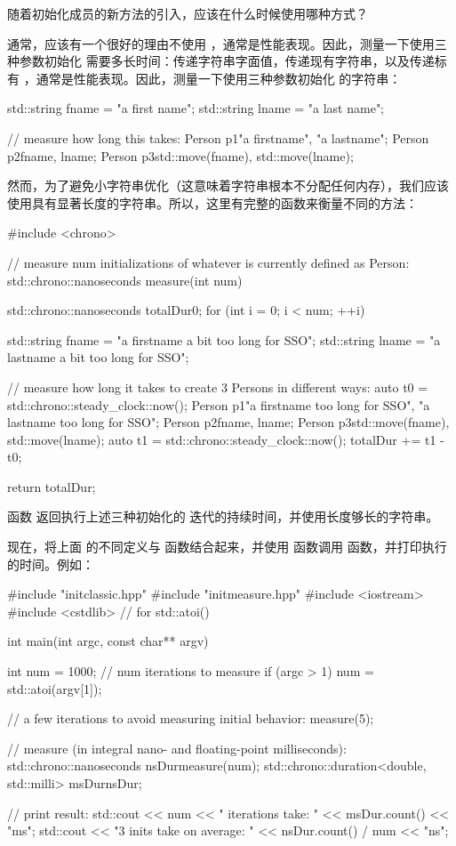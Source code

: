 随着初始化成员的新方法的引入，应该在什么时候使用哪种方式？

通常，应该有一个很好的理由不使用 ，通常是性能表现。因此，测量一下使用三种参数初始化  需要多长时间：传递字符串字面值，传递现有字符串，以及传递标有 ，通常是性能表现。因此，测量一下使用三种参数初始化  的字符串：

\begin{cppcode}
std::string fname = "a first name";
std::string lname = "a last name";

// measure how long this takes:
Person p1{"a firstname", "a lastname"};
Person p2{fname, lname};
Person p3{std::move(fname), std::move(lname)};
\end{cppcode}

然而，为了避免小字符串优化（这意味着字符串根本不分配任何内存），我们应该使用具有显著长度的字符串。所以，这里有完整的函数来衡量不同的方法：

\begin{cppcode}
#include <chrono>

// measure num initializations of whatever is currently defined as Person:
std::chrono::nanoseconds measure(int num)
{
	std::chrono::nanoseconds totalDur{0};
	for (int i = 0; i < num; ++i) {
		std::string fname = "a firstname a bit too long for SSO";
		std::string lname = "a lastname a bit too long for SSO";

		// measure how long it takes to create 3 Persons in different ways:
		auto t0 = std::chrono::steady_clock::now();
		Person p1{"a firstname too long for SSO", "a lastname too long for SSO"};
		Person p2{fname, lname};
		Person p3{std::move(fname), std::move(lname)};
		auto t1 = std::chrono::steady_clock::now();
		totalDur += t1 - t0;
	}
	return totalDur;
}
\end{cppcode}

函数  返回执行上述三种初始化的  迭代的持续时间，并使用长度够长的字符串。

现在，将上面  的不同定义与  函数结合起来，并使用  函数调用  函数，并打印执行的时间。例如：

\begin{cppcode}
#include "initclassic.hpp"
#include "initmeasure.hpp"
#include <iostream>
#include <cstdlib> // for std::atoi()

int main(int argc, const char** argv)
{
	int num = 1000; // num iterations to measure
	if (argc > 1) {
		num = std::atoi(argv[1]);
	}

	// a few iterations to avoid measuring initial behavior:
	measure(5);

	// measure (in integral nano- and floating-point milliseconds):
	std::chrono::nanoseconds nsDur{measure(num)};
	std::chrono::duration<double, std::milli> msDur{nsDur};

	// print result:
	std::cout << num << " iterations take: "
	<< msDur.count() << "ms\n";
	std::cout << "3 inits take on average: "
	<< nsDur.count() / num << "ns\n";
}
\end{cppcode}

